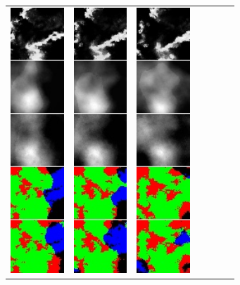 \begin{figure}[h]
\begin{tabular}{lllllll}
\includegraphics[width=20mm]{abb/prediction/103_maxCont}&
\includegraphics[width=20mm]{abb/prediction/104_maxCont}&
\includegraphics[width=20mm]{abb/prediction/105_maxCont}&

\end{tabular}
\end{figure}
